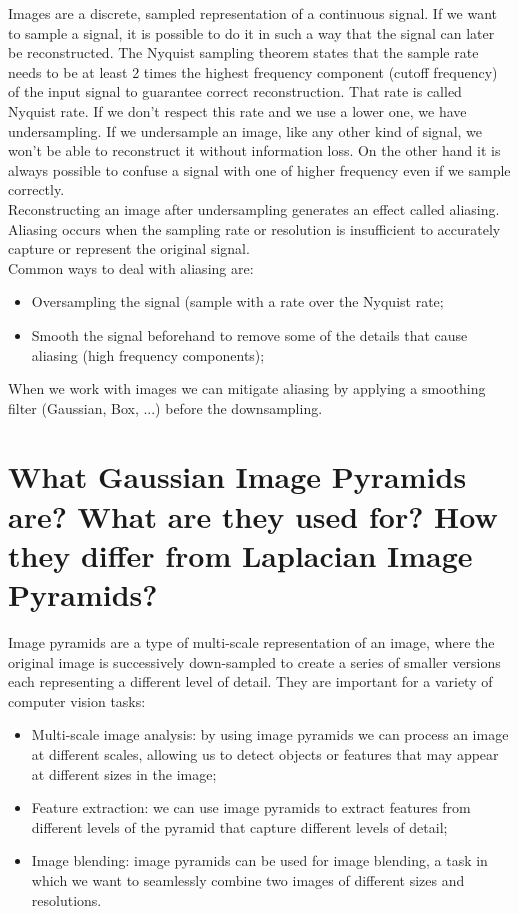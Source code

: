 \documentclass{article}
\begin{document}
Images are a discrete, sampled representation of a continuous signal. If we want to sample a signal, it is possible to do it in such a way that the signal can later be reconstructed. The Nyquist sampling theorem states that the sample rate needs to be at least 2 times the highest frequency component (cutoff frequency) of the input signal to guarantee correct reconstruction. That rate is called Nyquist rate. If we don't respect this rate and we use a lower one, we have undersampling. If we undersample an image, like any other kind of signal, we won't be able to reconstruct it without information loss. On the other hand it is always possible to confuse a signal with one of higher frequency even if we sample correctly. \\

Reconstructing an image after undersampling generates an effect called aliasing. Aliasing occurs when the sampling rate or resolution is insufficient to accurately capture or represent the original signal. \\

Common ways to deal with aliasing are:

\begin{itemize}
    \item Oversampling the signal (sample with a rate over the Nyquist rate;
    \item Smooth the signal beforehand to remove some of the details that cause aliasing (high frequency components);
\end{itemize}

When we work with images we can mitigate aliasing by applying a smoothing filter (Gaussian, Box, ...) before the downsampling.

\newpage

\section*{What Gaussian Image Pyramids are? What are they used for? How they differ from Laplacian Image Pyramids?}

Image pyramids are a type of multi-scale representation of an image, where the original image is successively down-sampled to create a series of smaller versions each representing a different level of detail.
They are important for a variety of computer vision tasks:

\begin{itemize}
    \item Multi-scale image analysis: by using image pyramids we can process an image at different scales, allowing us to detect objects or features that may appear at different sizes in the image;
    \item Feature extraction: we can use image pyramids to extract features from different levels of the pyramid that capture different levels of detail;
    \item Image blending: image pyramids can be used for image blending, a task in which we want to seamlessly combine two images of different sizes and resolutions. 
\end{itemize}
\end{document}
